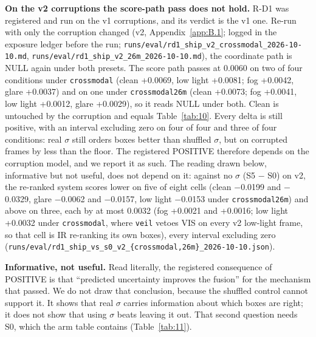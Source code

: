 \documentclass[10pt]{article}
\begin{document}
\textbf{On the v2 corruptions the score-path pass does not hold.} R-D1 was registered and run on the v1 corruptions, and its verdict is the v1 one. Re-run with only the corruption changed (v2, Appendix~\ref{app:B.1}; logged in the exposure ledger before the run; \texttt{runs/\allowbreak{}eval/\allowbreak{}rd1\_\allowbreak{}ship\_\allowbreak{}v2\_\allowbreak{}crossmodal\_\allowbreak{}2026-10-10.md}, \texttt{runs/\allowbreak{}eval/\allowbreak{}rd1\_\allowbreak{}ship\_\allowbreak{}v2\_\allowbreak{}26m\_\allowbreak{}2026-10-10.md}), the coordinate path is NULL again under both presets. The score path passes at 0.0060 on two of four conditions under \texttt{crossmodal} (clean +0.0069, low light +0.0081; fog +0.0042, glare +0.0037) and on one under \texttt{crossmodal26m} (clean +0.0073; fog +0.0041, low light +0.0012, glare +0.0029), so it reads NULL under both. Clean is untouched by the corruption and equals Table~\ref{tab:10}. Every delta is still positive, with an interval excluding zero on four of four and three of four conditions: real $\sigma$ still orders boxes better than shuffled $\sigma$, but on corrupted frames by less than the floor. The registered POSITIVE therefore depends on the corruption model, and we report it as such. The reading drawn below, informative but not useful, does not depend on it: against no $\sigma$ (S5 $-$ S0) on v2, the re-ranked system scores lower on five of eight cells (clean $-$0.0199 and $-$0.0329, glare $-$0.0062 and $-$0.0157, low light $-$0.0153 under \texttt{crossmodal26m}) and above on three, each by at most 0.0032 (fog +0.0021 and +0.0016; low light +0.0032 under \texttt{crossmodal}, where \texttt{veil} vetoes VIS on every v2 low-light frame, so that cell is IR re-ranking its own boxes), every interval excluding zero (\texttt{runs/\allowbreak{}eval/\allowbreak{}rd1\_\allowbreak{}ship\_\allowbreak{}vs\_\allowbreak{}s0\_\allowbreak{}v2\_\allowbreak{}\{crossmodal,26m\}\_\allowbreak{}2026-10-10.json}).

\textbf{Informative, not useful.} Read literally, the registered consequence of POSITIVE is that ``predicted uncertainty improves the fusion'' for the mechanism that passed. We do not draw that conclusion, because the shuffled control cannot support it. It shows that real $\sigma$ carries information about which boxes are right; it does not show that using $\sigma$ beats leaving it out. That second question needs S0, which the arm table contains (Table~\ref{tab:11}).
\end{document}
